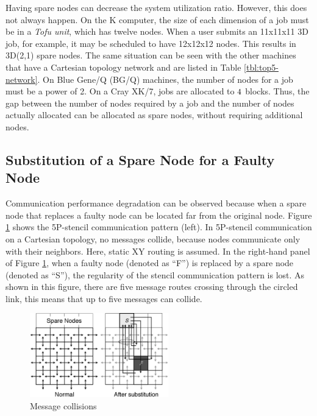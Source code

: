 \documentclass[Afour,times,sageh]{sagej}
\begin{document}
Having spare nodes can decrease the system utilization ratio. However,
this does not always happen. On the K computer, the size of each
dimension of a job must be in a {\it Tofu unit}, which has twelve
nodes. When a user submits an 11x11x11 3D job, for example, it may be
scheduled to have 12x12x12 nodes. This results in 3D(2,1) spare
nodes. The same situation can be seen with the other machines that
have a Cartesian topology network and are listed in Table
\ref{tbl:top5-network}. On Blue Gene/Q (BG/Q) machines, the number of
nodes for a job must be a power of 2\citep{BGQ-admin}. On a Cray XK/7,
jobs are allocated to $4 \time 2 \time 8$
blocks\citep{Pena:2013:ATM:2488551.2488564}. Thus, the gap between the
number of nodes required by a job and the number of nodes actually
allocated can be allocated as spare nodes, without requiring
additional nodes.

\subsection{Substitution of a Spare Node for a Faulty Node}
\label{sec:substitution}

Communication performance degradation can be observed because when a
spare node that replaces a faulty node can be located far from the
original node. Figure \ref{fig:collisions} shows the 5P-stencil
communication pattern (left). In 5P-stencil communication on a
Cartesian topology, no messages collide, because nodes communicate
only with their neighbors. Here, static XY routing is assumed. In the
right-hand panel of Figure \ref{fig:collisions}, when a faulty node
(denoted as ``F'') is replaced by a spare node (denoted as ``S''), the
regularity of the stencil communication pattern is lost. As shown in
this figure, there are five message routes crossing through the
circled link, this means that up to five messages can collide.

\begin{figure}[ht]
\centering
\includegraphics[width=60mm]{Figs/Collision.eps}
  \caption{Message collisions}
  \label{fig:collisions}
\end{figure}
\end{document}
